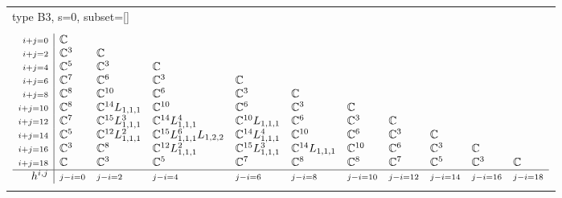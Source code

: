 \documentclass[crop,border=2mm]{standalone}
\begin{document}
\begin{tabular}{l}
{\huge type B3, s=0, subset=[]}\\ \\


$\displaystyle
\begin{array}{r|l l l l l l l l l l}
	{\scriptstyle i+j=0}&\mathbb{C}&&&&&&&&&\\
	{\scriptstyle i+j=2}&\mathbb{C}^{3}&\mathbb{C}&&&&&&&&\\
	{\scriptstyle i+j=4}&\mathbb{C}^{5}&\mathbb{C}^{3}&\mathbb{C}&&&&&&&\\
	{\scriptstyle i+j=6}&\mathbb{C}^{7}&\mathbb{C}^{6}&\mathbb{C}^{3}&\mathbb{C}&&&&&&\\
	{\scriptstyle i+j=8}&\mathbb{C}^{8}&\mathbb{C}^{10}&\mathbb{C}^{6}&\mathbb{C}^{3}&\mathbb{C}&&&&&\\
	{\scriptstyle i+j=10}&\mathbb{C}^{8}&\mathbb{C}^{14}L_{1,1,1}&\mathbb{C}^{10}&\mathbb{C}^{6}&\mathbb{C}^{3}&\mathbb{C}&&&&\\
	{\scriptstyle i+j=12}&\mathbb{C}^{7}&\mathbb{C}^{15}L_{1,1,1}^{3}&\mathbb{C}^{14}L_{1,1,1}^{4}&\mathbb{C}^{10}L_{1,1,1}&\mathbb{C}^{6}&\mathbb{C}^{3}&\mathbb{C}&&&\\
	{\scriptstyle i+j=14}&\mathbb{C}^{5}&\mathbb{C}^{12}L_{1,1,1}^{2}&\mathbb{C}^{15}L_{1,1,1}^{6}L_{1,2,2}&\mathbb{C}^{14}L_{1,1,1}^{4}&\mathbb{C}^{10}&\mathbb{C}^{6}&\mathbb{C}^{3}&\mathbb{C}&&\\
	{\scriptstyle i+j=16}&\mathbb{C}^{3}&\mathbb{C}^{8}&\mathbb{C}^{12}L_{1,1,1}^{2}&\mathbb{C}^{15}L_{1,1,1}^{3}&\mathbb{C}^{14}L_{1,1,1}&\mathbb{C}^{10}&\mathbb{C}^{6}&\mathbb{C}^{3}&\mathbb{C}&\\
	{\scriptstyle i+j=18}&\mathbb{C}&\mathbb{C}^{3}&\mathbb{C}^{5}&\mathbb{C}^{7}&\mathbb{C}^{8}&\mathbb{C}^{8}&\mathbb{C}^{7}&\mathbb{C}^{5}&\mathbb{C}^{3}&\mathbb{C}\\
	\hline h^{i,j}&{\scriptstyle j-i=0}&{\scriptstyle j-i=2}&{\scriptstyle j-i=4}&{\scriptstyle j-i=6}&{\scriptstyle j-i=8}&{\scriptstyle j-i=10}&{\scriptstyle j-i=12}&{\scriptstyle j-i=14}&{\scriptstyle j-i=16}&{\scriptstyle j-i=18}
\end{array}
$ \\ \\



\end{tabular}
\end{document}
